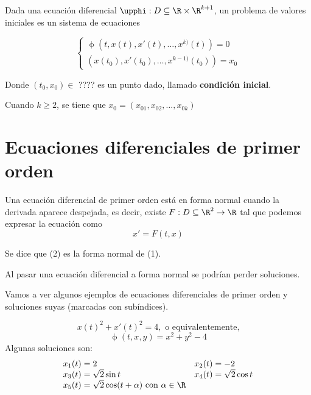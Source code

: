 \begin{ndef}
  Dada una ecuación diferencial $\upphi:D \subseteq \R\times\R^{k+1}$, un problema de valores iniciales es un sistema de ecuaciones

  \[
  \begin{cases}
    \upphi\left(t, x(t), x'(t), \dots, x^{k)}(t)\right) = 0 \\
    \left(x(t_0),x'(t_0),\dots,x^{k-1)}(t_0)\right) = x_0
  \end{cases}
  \]

  Donde $(t_0,x_0) \in$ ???? es un punto dado, llamado \textbf{condición inicial}.
\end{ndef}

\begin{nota} Cuando $k\ge2$, se tiene que $x_0=(x_{01},x_{02},\dots,x_{0k})$
	
\end{nota}

\section{Ecuaciones diferenciales de primer orden}

\begin{ndef}
Una ecuación diferencial de primer orden está en forma normal cuando la derivada aparece despejada, es decir, existe $F : D\subseteq \R^2 \to \R$ tal que podemos expresar la ecuación como
  \[
    x' = F\left(t,x\right)
  \]

  Se dice que (2) es la forma normal de (1).
  
\end{ndef}

\begin{nota} Al pasar una ecuación diferencial a forma normal se podrían perder soluciones.
	
\end{nota}

Vamos a ver algunos ejemplos de ecuaciones diferenciales de primer orden y soluciones suyas (marcadas con subíndices).

\begin{ejemplo}
\[x(t)^2 + x'(t)^2 = 4, \text{ o equivalentemente,} \]
\[ \upphi(t,x,y) = x^2+y^2 -4\]
Algunas soluciones son:
\[ 
\begin{array}{ll}
  x_1(t) = 2 & x_2(t) = -2 \\
  x_3(t) = \sqrt{2}\sin t & x_4(t) = \sqrt{2}\cos t \\
  x_5(t) = \sqrt{2}\cos(t+\alpha) \text{ con } \alpha\in\R
\end{array}
\]
\end{ejemplo}

